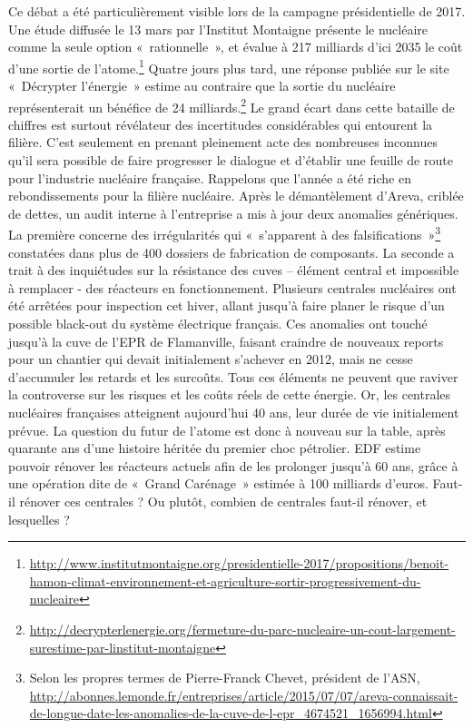 Ce débat a été particulièrement visible lors de la campagne présidentielle de 2017. Une étude diffusée le 13 mars par l’Institut Montaigne présente le nucléaire comme la seule option  «~rationnelle~», et évalue à 217 milliards d’ici 2035 le coût d’une sortie de l’atome.\footnote{\url{http://www.institutmontaigne.org/presidentielle-2017/propositions/benoit-hamon-climat-environnement-et-agriculture-sortir-progressivement-du-nucleaire}} Quatre jours plus tard, une réponse publiée sur le site «~Décrypter l’énergie~» estime au contraire que la sortie du nucléaire représenterait un bénéfice de 24 milliards.\footnote{\url{http://decrypterlenergie.org/fermeture-du-parc-nucleaire-un-cout-largement-surestime-par-linstitut-montaigne}} Le grand écart dans cette bataille de chiffres est surtout révélateur des incertitudes considérables qui entourent la filière. C’est seulement en prenant pleinement acte des nombreuses inconnues qu’il sera possible de faire progresser le dialogue et d’établir une feuille de route pour l’industrie nucléaire française.
Rappelons que l’année a été riche en rebondissements pour la filière nucléaire. Après le démantèlement d’Areva, criblée de dettes, un audit interne à l’entreprise a mis à jour deux anomalies génériques. La première concerne des irrégularités qui «~s’apparent à des falsifications~»\footnote{Selon les propres termes de Pierre-Franck Chevet, président de l'ASN, \url{http://abonnes.lemonde.fr/entreprises/article/2015/07/07/areva-connaissait-de-longue-date-les-anomalies-de-la-cuve-de-l-epr_4674521_1656994.html}} constatées dans plus de 400 dossiers de fabrication de composants. La seconde a trait à des inquiétudes sur la résistance des cuves – élément central et impossible à remplacer - des réacteurs en fonctionnement. Plusieurs centrales nucléaires ont été arrêtées pour inspection cet hiver, allant jusqu’à faire planer le risque d’un possible black-out du système électrique français. Ces anomalies ont touché jusqu’à la cuve de l’EPR de Flamanville, faisant craindre de nouveaux reports pour un chantier qui devait initialement s’achever en 2012, mais ne cesse d’accumuler les retards et les surcoûts. Tous ces éléments ne peuvent que raviver la controverse sur les risques et les coûts réels de cette énergie. 
Or, les centrales nucléaires françaises atteignent aujourd’hui 40 ans, leur durée de vie initialement prévue. La question du futur de l’atome est donc à nouveau sur la table, après quarante ans d’une histoire héritée du premier choc pétrolier. EDF estime pouvoir rénover les réacteurs actuels afin de les prolonger jusqu’à 60 ans, grâce à une opération dite de  «~Grand Carénage~» estimée à 100 milliards d’euros. Faut-il rénover ces centrales ? Ou plutôt, combien de centrales faut-il rénover, et lesquelles ?


